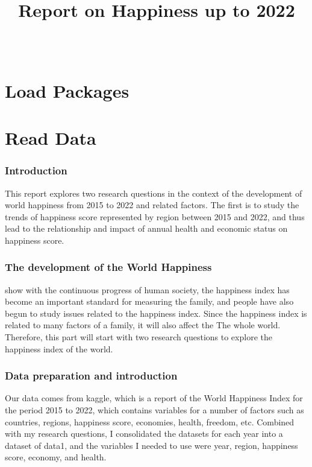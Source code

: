 \documentclass[11pt,a4paper,]{article}
\title{Report on Happiness up to 2022}
\author{\sf{\Large\textbf{Zhixiang Yang}\\\large EBS Honours Student\\[0.5cm]}{\Large\textbf{Yiqi Wang}\\\large Master of BA Student\\[0.5cm]}{\Large\textbf{Xintong You}\\\large Master of BA Student\\[0.5cm]}}
\date{\sf\Date~\Month~\Year}
\makeatletter
\def\titlepage{\front{\expandafter{\@title}}{\@author}{\@organization}}
\makeatother
\begin{document}
\titlepage

\hypertarget{load-packages}{%
\section{Load Packages}\label{load-packages}}

\hypertarget{read-data}{%
\section{Read Data}\label{read-data}}

\hypertarget{introduction}{%
\subsubsection{Introduction}\label{introduction}}

This report explores two research questions in the context of the development of world happiness from 2015 to 2022 and related factors. The first is to study the trends of happiness score represented by region between 2015 and 2022, and thus lead to the relationship and impact of annual health and economic status on happiness score.

\hypertarget{the-development-of-the-world-happiness}{%
\subsubsection{The development of the World Happiness}\label{the-development-of-the-world-happiness}}

\textcite{helliwell2012state} show with the continuous progress of human society, the happiness index has become an important standard for measuring the family, and people have also begun to study issues related to the happiness index. Since the happiness index is related to many factors of a family, it will also affect the The whole world. Therefore, this part will start with two research questions to explore the happiness index of the world.

\hypertarget{data-preparation-and-introduction}{%
\subsubsection{Data preparation and introduction}\label{data-preparation-and-introduction}}

Our data comes from kaggle, which is a report of the World Happiness Index for the period 2015 to 2022, which contains variables for a number of factors such as countries, regions, happiness score, economies, health, freedom, etc. Combined with my research questions, I consolidated the datasets for each year into a dataset of data1, and the variables I needed to use were year, region, happiness score, economy, and health.
\end{document}
